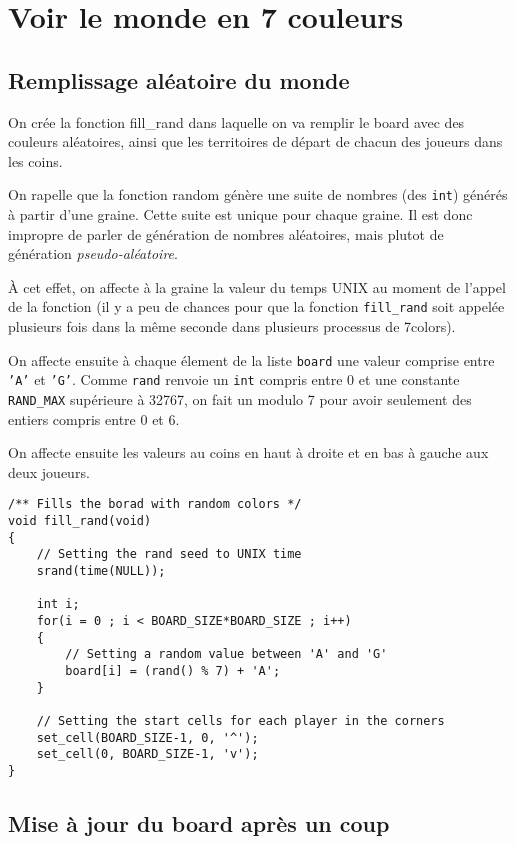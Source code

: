 \documentclass[a4paper,11pt]{article}
\begin{document}
	
	
	
	
	\section{Voir le monde en 7 couleurs}
	
	
	\subsection{Remplissage aléatoire du monde}
	
	On crée la fonction fill\_rand dans laquelle on va remplir le board avec des couleurs aléatoires, ainsi que les territoires de départ de chacun des joueurs dans les coins.
	
	On rapelle que la fonction random génère une suite de nombres (des \texttt{int}) générés à partir d'une graine. Cette suite est unique pour chaque graine. Il est donc impropre de parler de génération de nombres aléatoires, mais plutot de génération \emph{pseudo-aléatoire}.
	
	À cet effet, on affecte à la graine la valeur du temps UNIX au moment de l'appel de la fonction (il y a peu de chances pour que la fonction \texttt{fill\_rand} soit appelée plusieurs fois dans la même seconde dans plusieurs processus de 7colors).
	
	On affecte ensuite à chaque élement de la liste \texttt{board} une valeur comprise entre \texttt{'A'} et \texttt{'G'}. Comme \texttt{rand} renvoie un \texttt{int} compris entre 0 et une constante \texttt{RAND\_MAX} supérieure à 32767, on fait un modulo 7 pour avoir seulement des entiers compris entre 0 et 6.
	
	On affecte ensuite les valeurs au coins en haut à droite et en bas à gauche aux deux joueurs.
	
	\begin{lstlisting}
/** Fills the borad with random colors */
void fill_rand(void)
{
	// Setting the rand seed to UNIX time
	srand(time(NULL));
	
	int i;
	for(i = 0 ; i < BOARD_SIZE*BOARD_SIZE ; i++)
	{
		// Setting a random value between 'A' and 'G'
		board[i] = (rand() % 7) + 'A';
	}
	
	// Setting the start cells for each player in the corners
	set_cell(BOARD_SIZE-1, 0, '^');
	set_cell(0, BOARD_SIZE-1, 'v');
}
	\end{lstlisting}
	
	
	\subsection{Mise à jour du board après un coup}
	\label{MAJ}
	
\end{document}
